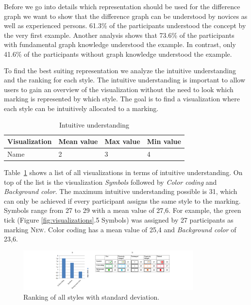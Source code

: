 \documentclass{llncs}
\begin{document}
Before we go into details which representation should be used for the difference graph we want to show that the difference graph can be understood by novices as well as experienced persons. 61.3\% of the participants understood the concept by the very first example. Another analysis shows that 73.6\% of the participants with fundamental graph knowledge understood the example. In contrast, only 41.6\% of the participants without graph knowledge understood the example.

To find the best suiting representation we analyze the intuitive understanding and the ranking for each style. The intuitive understanding is important to allow users to gain an overview of the visualization without the need to look which marking is represented by which style. The goal is to find a visualization where each style can be intuitively allocated to a marking.

\begin{table}
\centering
\begin{tabular}{|l|l|l|l|}
	\hline
	Visualization & Mean value  & Max value  & Min value \\
	\hline
	Name & 2 & 3 & 4 \\
	\hline  
\end{tabular}
\caption{Intuitive understanding}
\label{tab:IntuitiveUnderstanding}
\end{table}

Table~\ref{tab:IntuitiveUnderstanding} shows a list of all visualizations in terms of intuitive understanding. On top of the list is the visualization \emph{Symbols} followed by \emph{Color coding} and \emph{Background color}. The maximum intuitive understanding possible is 31, which can only be achieved if every participant assigns the same style to the marking. Symbols range from 27 to 29 with a mean value of 27,6. For example, the green tick (Figure \ref{fig:visualizations}.5 Symbols)  was assigned by 27 participants as marking \textsc{New}. Color coding has a mean value of 25,4 and \emph{Background color} of 23,6.

\begin{figure}
	\centering
	\includegraphics[width=350px]{Images/Results.PNG}
	\caption{Ranking of all styles with standard deviation.}
	\label{fig:SurveyResults}
\end{figure}
\end{document}
